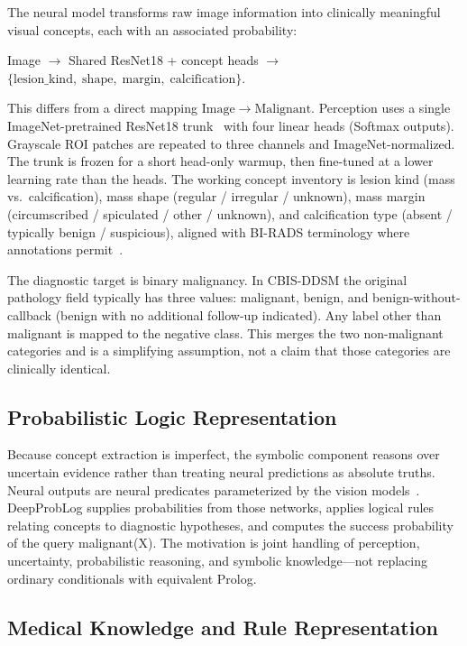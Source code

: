 The neural model transforms raw image information into clinically meaningful visual concepts, each with an associated probability:
\begin{center}
\small
Image $\rightarrow$ Shared ResNet18 + concept heads $\rightarrow$ $\{\mathrm{lesion\_kind},\;\mathrm{shape},\;\mathrm{margin},\;\mathrm{calcification}\}$.
\end{center}
This differs from a direct mapping $\mathrm{Image}\rightarrow\mathrm{Malignant}$. Perception uses a single ImageNet-pretrained ResNet18 trunk~\cite{he2016resnet} with four linear heads (Softmax outputs). Grayscale ROI patches are repeated to three channels and ImageNet-normalized. The trunk is frozen for a short head-only warmup, then fine-tuned at a lower learning rate than the heads. The working concept inventory is lesion kind (mass vs.\ calcification), mass shape (regular / irregular / unknown), mass margin (circumscribed / spiculated / other / unknown), and calcification type (absent / typically benign / suspicious), aligned with BI-RADS terminology where annotations permit~\cite{acr2013birads,lee2017cbis}.

The diagnostic target is binary malignancy. In CBIS-DDSM the original pathology field typically has three values: malignant, benign, and benign-without-callback (benign with no additional follow-up indicated). Any label other than malignant is mapped to the negative class. This merges the two non-malignant categories and is a simplifying assumption, not a claim that those categories are clinically identical.

\subsection{Probabilistic Logic Representation}
\label{sec:problog}

Because concept extraction is imperfect, the symbolic component reasons over uncertain evidence rather than treating neural predictions as absolute truths. Neural outputs are neural predicates parameterized by the vision models~\cite{deraedt2007problog,manhaeve2018deepproblog}. DeepProbLog supplies probabilities from those networks, applies logical rules relating concepts to diagnostic hypotheses, and computes the success probability of the query malignant(X). The motivation is joint handling of perception, uncertainty, probabilistic reasoning, and symbolic knowledge---not replacing ordinary conditionals with equivalent Prolog.

\subsection{Medical Knowledge and Rule Representation}
\label{sec:knowledge}

